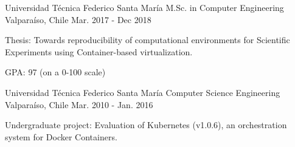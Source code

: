 \begin{cventries}
  \cventry
    {Universidad Técnica Federico Santa María}
        {M.Sc. in Computer Engineering}
    {Valparaíso, Chile}
    {Mar. 2017 - Dec 2018}
    {
      \begin{cvitems}
        \item{Thesis: Towards reproducibility of computational environments for Scientific Experiments using Container-based virtualization.}
        \item{GPA: 97 (on a 0-100 scale)}
      \end{cvitems}
    }
    
  \cventry
      {Universidad Técnica Federico Santa María}
    {Computer Science Engineering}
    {Valparaíso, Chile}
    {Mar. 2010 - Jan. 2016}
    {
      \begin{cvitems}
        \item {Undergraduate project: Evaluation of Kubernetes (v1.0.6), an orchestration system for Docker Containers.}
        \end{cvitems}
    }
\end{cventries}
